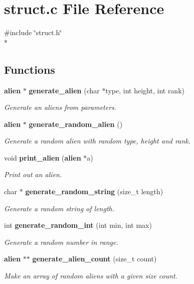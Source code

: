 \section{struct.\-c File Reference}
\label{struct_8c}
{\ttfamily \#include \char`\"{}struct.\-h\char`\"{}}\\*
\subsection*{Functions}
\begin{DoxyCompactItemize}
\item 
{\bf alien} $\ast$ {\bf generate\-\_\-alien} (char $\ast$type, int height, int rank)
\begin{DoxyCompactList}\small\item\em Generate an aliens from parameters. \end{DoxyCompactList}\item 
{\bf alien} $\ast$ {\bf generate\-\_\-random\-\_\-alien} ()
\begin{DoxyCompactList}\small\item\em Generate a random alien with random type, height and rank. \end{DoxyCompactList}\item 
void {\bf print\-\_\-alien} ({\bf alien} $\ast$a)
\begin{DoxyCompactList}\small\item\em Print out an alien. \end{DoxyCompactList}\item 
char $\ast$ {\bf generate\-\_\-random\-\_\-string} (size\-\_\-t length)
\begin{DoxyCompactList}\small\item\em Generate a random string of length. \end{DoxyCompactList}\item 
int {\bf generate\-\_\-random\-\_\-int} (int min, int max)
\begin{DoxyCompactList}\small\item\em Generate a random number in range. \end{DoxyCompactList}\item 
{\bf alien} $\ast$$\ast$ {\bf generate\-\_\-alien\-\_\-count} (size\-\_\-t count)
\begin{DoxyCompactList}\small\item\em Make an array of random aliens with a given size count. \end{DoxyCompactList}\item 
$$
\end{DoxyCompactItemize}
